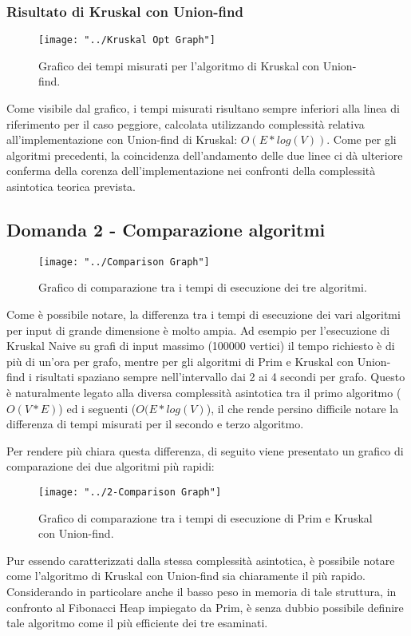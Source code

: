 \subsubsection{Risultato di Kruskal con Union-find}
\begin{figure}[H]
	\centering
	\texttt{[image: "../Kruskal Opt Graph"]}
	\caption{Grafico dei tempi misurati per l'algoritmo di Kruskal con Union-find.}
	\label{fig:kruskal-opt-graph}
\end{figure}
Come visibile dal grafico, i tempi misurati risultano sempre inferiori alla linea di riferimento per il caso peggiore, calcolata utilizzando complessità relativa all'implementazione con Union-find di Kruskal: $O(E*log(V))$. Come per gli algoritmi precedenti, la coincidenza dell'andamento delle due linee ci dà ulteriore conferma della corenza dell'implementazione nei confronti della complessità asintotica teorica prevista.

\subsection{Domanda 2 - Comparazione algoritmi}
\begin{figure}[H]
	\centering
	\texttt{[image: "../Comparison Graph"]}
	\caption{Grafico di comparazione tra i tempi di esecuzione dei tre algoritmi.}
	\label{fig:comparison-graph}
\end{figure}
Come è possibile notare, la differenza tra i tempi di esecuzione dei vari algoritmi per input di grande dimensione è molto ampia. Ad esempio per l'esecuzione di Kruskal Naive su grafi di input massimo (100000 vertici) il tempo richiesto è di più di un'ora per grafo, mentre per gli algoritmi di Prim e Kruskal con Union-find i risultati spaziano sempre nell'intervallo dai 2 ai 4 secondi per grafo. Questo è naturalmente legato alla diversa complessità asintotica tra il primo algoritmo ($O(V*E)$) ed i seguenti ($O(E*log(V)$), il che rende persino difficile notare la differenza di tempi misurati per il secondo e terzo algoritmo.

Per rendere più chiara questa differenza, di seguito viene presentato un grafico di comparazione dei due algoritmi più rapidi:
\begin{figure}[H]
	\centering
	\texttt{[image: "../2-Comparison Graph"]}
	\caption{Grafico di comparazione tra i tempi di esecuzione di Prim e Kruskal con Union-find.}
	\label{fig:2-comparison-graph}
\end{figure}
Pur essendo caratterizzati dalla stessa complessità asintotica, è possibile notare come l'algoritmo di Kruskal con Union-find sia chiaramente il più rapido. Considerando in particolare anche il basso peso in memoria di tale struttura, in confronto al Fibonacci Heap impiegato da Prim, è senza dubbio possibile definire tale algoritmo come il più efficiente dei tre esaminati.